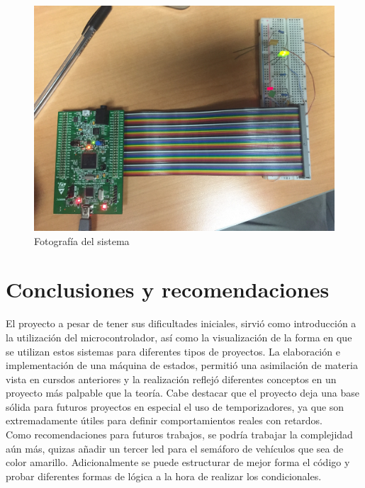 \documentclass[letterpaper]{article}
\begin{document}
\begin{figure}[hbtp]
\centering
\includegraphics[width=12 cm]{fotillo.png}
\caption{Fotografía del sistema}
\label{foto}
\end{figure}

\newpage
\section{Conclusiones y recomendaciones}

El proyecto a pesar de tener sus dificultades iniciales, sirvió como introducción a la utilización del microcontrolador, así como la visualización de la forma en que se utilizan estos sistemas para diferentes tipos de proyectos. La elaboración e implementación de una máquina de estados, permitió una asimilación de materia vista en cursdos anteriores y la realización reflejó diferentes conceptos en un proyecto más palpable que la teoría. Cabe destacar que el proyecto deja una base sólida para futuros proyectos en especial el uso de temporizadores, ya que son extremadamente útiles para definir comportamientos reales con retardos. \\[0.5cm]

Como recomendaciones para futuros trabajos, se podría trabajar la complejidad aún más, quizas añadir un tercer led para el semáforo de vehículos que sea de color amarillo. Adicionalmente se puede estructurar de mejor forma el código y probar diferentes formas de lógica a la hora de realizar los condicionales. 



 

\end{document}
